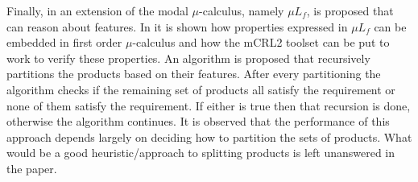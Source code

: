 Finally, in \cite{FTSMu} an extension of the modal $\mu$-calculus, namely $\mu L_f$, is proposed that can reason about features. In \cite{FamBasedModelCheckingWithMCRL2} it is shown how properties expressed in $\mu L_f$ can be embedded in first order $\mu$-calculus and how the mCRL2 toolset \cite{mCRL2Toolset} can be put to work to verify these properties. An algorithm is proposed that recursively partitions the products based on their features. After every partitioning the algorithm checks if the remaining set of products all satisfy the requirement or none of them satisfy the requirement. If either is true then that recursion is done, otherwise the algorithm continues. It is observed that the performance of this approach depends largely on deciding how to partition the sets of products. What would be a good heuristic/approach to splitting products is left unanswered in the paper.